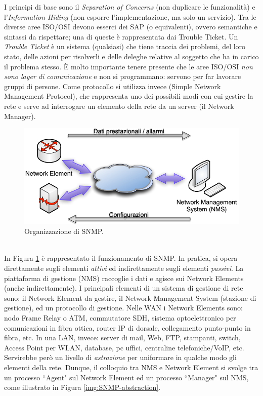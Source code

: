 I principi di base sono il \textit{Separation of Concerns} (non duplicare le funzionalità) e l'\textit{Information Hiding} (non esporre l'implementazione, ma solo un servizio). Tra le diverse aree ISO/OSI devono esserci dei SAP (o equivalenti), ovvero semantiche e sintassi da rispettare; una di queste è rappresentata dai Trouble Ticket. Un \textit{Trouble Ticket} è un sistema (qualsiasi) che tiene traccia dei problemi, del loro stato, delle azioni per risolverli e delle deleghe relative al soggetto che ha in carico il problema stesso. È molto importante tenere presente che le aree ISO/OSI \textit{non sono layer di comunicazione} e non si programmano: servono per far lavorare gruppi di persone. Come protocollo si utilizza invece  (Simple Network Management Protocol), che rappresenta uno dei possibili modi con cui gestire la rete e serve ad interrogare un elemento della rete da un server (il Network Manager).
\begin{figure}[htbp]
	\centering
	\includegraphics[scale = 0.55]{images/SNMP}
	\caption{Organizzazione di SNMP.}
	\label{img:SNMP}
\end{figure}\\
In Figura \ref{img:SNMP} è rappresentato il funzionamento di SNMP. In pratica, si opera direttamente sugli elementi \textit{attivi} ed indirettamente sugli elementi \textit{passivi}. La piattaforma di gestione (NMS) raccoglie i dati e agisce sui Network Elements (anche indirettamente). I principali elementi di un sistema di gestione di rete sono: il Network Element da gestire, il Network Management System (stazione di gestione), ed un protocollo di gestione. Nelle WAN i Network Elements sono: nodo Frame Relay o ATM, commutatore SDH, sistema optoelettronico per comunicazioni in fibra ottica, router IP di dorsale, collegamento punto-punto in fibra, etc. In una LAN, invece: server di mail, Web, FTP, stampanti, switch, Access Point per WLAN, database, pc uffici, centraline telefoniche/VoIP, etc. Servirebbe però un livello di \textit{astrazione} per uniformare in qualche modo gli elementi della rete. Dunque, il colloquio tra NMS e Network Element si svolge tra un processo \textquotedblleft Agent" sul Network Element ed un processo \textquotedblleft Manager" sul NMS, come illustrato in Figura \ref{img:SNMP-abstraction}.
